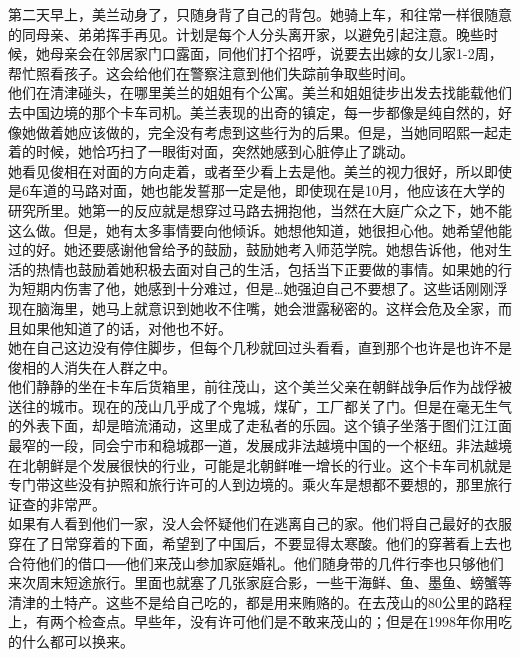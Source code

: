 第二天早上，美兰动身了，只随身背了自己的背包。她骑上车，和往常一样很随意的同母亲、弟弟挥手再见。计划是每个人分头离开家，以避免引起注意。晚些时候，她母亲会在邻居家门口露面，同他们打个招呼，说要去出嫁的女儿家1-2周，帮忙照看孩子。这会给他们在警察注意到他们失踪前争取些时间。\\

他们在清津碰头，在哪里美兰的姐姐有个公寓。美兰和姐姐徒步出发去找能载他们去中国边境的那个卡车司机。美兰表现的出奇的镇定，每一步都像是纯自然的，好像她做着她应该做的，完全没有考虑到这些行为的后果。但是，当她同昭熙一起走着的时候，她恰巧扫了一眼街对面，突然她感到心脏停止了跳动。\\

她看见俊相在对面的方向走着，或者至少看上去是他。美兰的视力很好，所以即使是6车道的马路对面，她也能发誓那一定是他，即使现在是10月，他应该在大学的研究所里。她第一的反应就是想穿过马路去拥抱他，当然在大庭广众之下，她不能这么做。但是，她有太多事情要向他倾诉。她想他知道，她很担心他。她希望他能过的好。她还要感谢他曾给予的鼓励，鼓励她考入师范学院。她想告诉他，他对生活的热情也鼓励着她积极去面对自己的生活，包括当下正要做的事情。如果她的行为短期内伤害了他，她感到十分难过，但是…她强迫自己不要想了。这些话刚刚浮现在脑海里，她马上就意识到她收不住嘴，她会泄露秘密的。这样会危及全家，而且如果他知道了的话，对他也不好。\\

她在自己这边没有停住脚步，但每个几秒就回过头看看，直到那个也许是也许不是俊相的人消失在人群之中。\\

他们静静的坐在卡车后货箱里，前往茂山，这个美兰父亲在朝鲜战争后作为战俘被送往的城市。现在的茂山几乎成了个鬼城，煤矿，工厂都关了门。但是在毫无生气的外表下面，却是暗流涌动，这里成了走私者的乐园。这个镇子坐落于图们江江面最窄的一段，同会宁市和稳城郡一道，发展成非法越境中国的一个枢纽。非法越境在北朝鲜是个发展很快的行业，可能是北朝鲜唯一增长的行业。这个卡车司机就是专门带这些没有护照和旅行许可的人到边境的。乘火车是想都不要想的，那里旅行证查的非常严。\\

如果有人看到他们一家，没人会怀疑他们在逃离自己的家。他们将自己最好的衣服穿在了日常穿着的下面，希望到了中国后，不要显得太寒酸。他们的穿著看上去也合符他们的借口──他们来茂山参加家庭婚礼。他们随身带的几件行李也只够他们来次周末短途旅行。里面也就塞了几张家庭合影，一些干海鲜、鱼、墨鱼、螃蟹等清津的土特产。这些不是给自己吃的，都是用来贿赂的。在去茂山的80公里的路程上，有两个检查点。早些年，没有许可他们是不敢来茂山的；但是在1998年你用吃的什么都可以换来。\\

